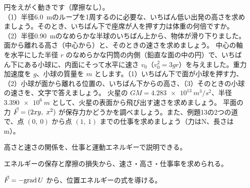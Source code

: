\bkproblem 円をえがく動きです（摩擦なし）。\\
（1）半径\qty{6.0}{m}のループを1周するのに必要な、いちばん低い出発の高さを求めましょう。そのとき、いちばん下で座席が人を押す力は体重の何倍ですか。\\
（2）半径\qty{0.90}{m}のなめらかな半球のいちばん上から、物体が滑り下りました。面から離れる高さ（中心から）と、そのときの速さを求めましょう。
\bkproblem 中心の軸を水平にした半径 $r$ のなめらかな円筒の内側（鉛直な面の中の円）で、いちばん下にある小球に、内面にそって水平に速さ $v_0$（$v_0^2=3gr$）を与えました。重力加速度を $g$、小球の質量を $m$ とします。（1）いちばん下で面が小球を押す力、（2）小球が面から離れる位置の、いちばん下からの高さ、（3）そのときの小球の速さを、文字で答えましょう。
\bkproblem 火星の $GM=\qty{4.283e13}{m^3/s^2}$、半径 $\qty{3.390e6}{m}$ として、火星の表面から飛び出す速さを求めましょう。
\bkproblem 平面の力 $\vec{F}=(2xy,\ x^2)$ が保存力かどうかを調べましょう。また、例題13の2つの道で、点 $(0,\ 0)$ から点 $(1,\ 1)$ までの仕事を求めましょう（力はN、長さはm）。

\begin{furikaeri}
\begin{checklist}
\item 高さと速さの関係を、仕事と運動エネルギーで説明できる。
\item エネルギーの保存と摩擦の損失から、速さ・高さ・仕事率を求められる。
\item $\vec{F}=-\mathrm{grad}\,U$ から、位置エネルギーの式を導ける。
\end{checklist}
\end{furikaeri}
